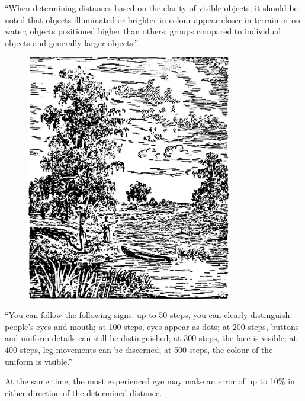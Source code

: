 ``When determining distances based on the clarity of visible objects, it should be noted that objects illuminated or brighter in colour appear closer in terrain or on water; objects positioned higher than others; groups compared to individual objects and generally larger objects.''

\begin{figure}[h!]
\centering
\includegraphics[width=0.8\textwidth]{figures/ch-04/fig-079.pdf}
\end{figure}

``You can follow the following signs: up to 50 steps, you can clearly distinguish people's eyes and mouth; at 100 steps, eyes appear as dots; at 200 steps, buttons and uniform details can still be distinguished; at 300 steps, the face is visible; at 400 steps, leg movements can be discerned; at 500 steps, the colour of the uniform is visible.''

At the same time, the most experienced eye may make an error of up to 10\% in either direction of the determined distance.


